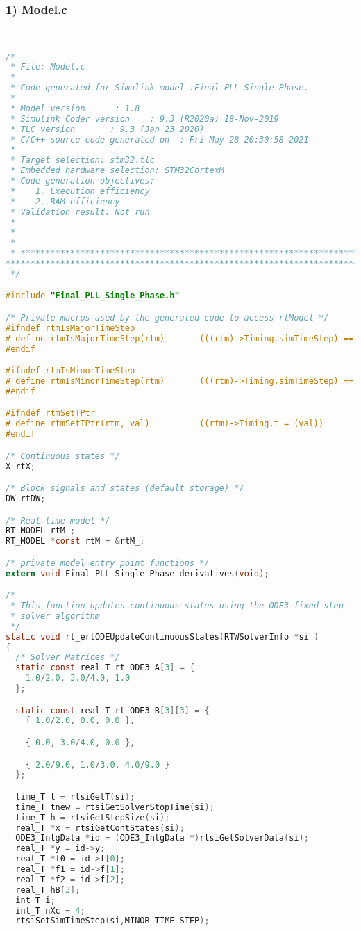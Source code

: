 \subsubsection{1) Model.c}
\begin{lstlisting}[language=C,caption=Model.c]


/*
 * File: Model.c
 *
 * Code generated for Simulink model :Final_PLL_Single_Phase.
 *
 * Model version      : 1.8
 * Simulink Coder version    : 9.3 (R2020a) 18-Nov-2019
 * TLC version       : 9.3 (Jan 23 2020)
 * C/C++ source code generated on  : Fri May 28 20:30:58 2021
 *
 * Target selection: stm32.tlc
 * Embedded hardware selection: STM32CortexM
 * Code generation objectives:
 *    1. Execution efficiency
 *    2. RAM efficiency
 * Validation result: Not run
 *
 *
 *
 * ******************************************************************************
******************************************************************************
 */

#include "Final_PLL_Single_Phase.h"

/* Private macros used by the generated code to access rtModel */
#ifndef rtmIsMajorTimeStep
# define rtmIsMajorTimeStep(rtm)       (((rtm)->Timing.simTimeStep) == MAJOR_TIME_STEP)
#endif

#ifndef rtmIsMinorTimeStep
# define rtmIsMinorTimeStep(rtm)       (((rtm)->Timing.simTimeStep) == MINOR_TIME_STEP)
#endif

#ifndef rtmSetTPtr
# define rtmSetTPtr(rtm, val)          ((rtm)->Timing.t = (val))
#endif

/* Continuous states */
X rtX;

/* Block signals and states (default storage) */
DW rtDW;

/* Real-time model */
RT_MODEL rtM_;
RT_MODEL *const rtM = &rtM_;

/* private model entry point functions */
extern void Final_PLL_Single_Phase_derivatives(void);

/*
 * This function updates continuous states using the ODE3 fixed-step
 * solver algorithm
 */
static void rt_ertODEUpdateContinuousStates(RTWSolverInfo *si )
{
  /* Solver Matrices */
  static const real_T rt_ODE3_A[3] = {
    1.0/2.0, 3.0/4.0, 1.0
  };

  static const real_T rt_ODE3_B[3][3] = {
    { 1.0/2.0, 0.0, 0.0 },

    { 0.0, 3.0/4.0, 0.0 },

    { 2.0/9.0, 1.0/3.0, 4.0/9.0 }
  };

  time_T t = rtsiGetT(si);
  time_T tnew = rtsiGetSolverStopTime(si);
  time_T h = rtsiGetStepSize(si);
  real_T *x = rtsiGetContStates(si);
  ODE3_IntgData *id = (ODE3_IntgData *)rtsiGetSolverData(si);
  real_T *y = id->y;
  real_T *f0 = id->f[0];
  real_T *f1 = id->f[1];
  real_T *f2 = id->f[2];
  real_T hB[3];
  int_T i;
  int_T nXc = 4;
  rtsiSetSimTimeStep(si,MINOR_TIME_STEP);


\end{lstlisting}
